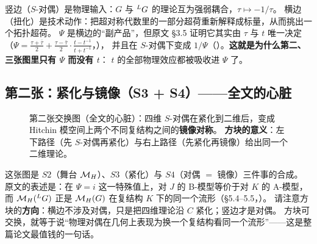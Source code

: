 竖边（$S$-对偶）是物理输入：$G$ 与 ${}^{L}G$ 的理论互为强弱耦合，$\tau\mapsto-1/\tau$。
横边（扭化）是技术动作：把超对称代数里的一部分超荷重新解释成标量，从而挑出一个拓扑超荷。
$\Psi$ 是横边的“副产品”，但原文 \S3.5 证明它其实由 $\tau$ 与 $t$ 唯一决定
（$\Psi=\frac{\tau+\bar\tau}{2}+\frac{\tau-\bar\tau}{2}\cdot\frac{t-t^{-1}}{t+t^{-1}}$，），
并且在 $S$-对偶下变成 $1/\Psi$\pA（）。\textbf{这就是为什么第二、三张图里只有 $\Psi$ 而没有 $t$}：
$t$ 的全部物理效应都被吸收进 $\Psi$ 了。

\subsection{第二张：紧化与镜像（S3 + S4）——全文的心脏}

\begin{figure}[htbp]
\centering
{}
\caption{第二张交换图（全文的心脏）：四维 $S$-对偶在紧化到二维后，变成 Hitchin 模空间上两个不同复结构之间的\textbf{镜像对称}。
\textbf{方块的意义}：左下路径（先 $S$-对偶再紧化）与右上路径（先紧化再镜像）给出同一个二维理论。}
\label{fig:concept-2}
\end{figure}

这张图是 $S2$（舞台 $\mathcal{M}_H$）、$S3$（紧化）与 $S4$（对偶 $=$ 镜像）三件事的合成。
原文的表述是：在 $\Psi=i$ 这一特殊值上，对 $J$ 的 B-模型等价于对 $K$ 的 A-模型，而
$\mathcal{M}_H({}^{L}G)$ 正是 $\mathcal{M}_H(G)$ 在复结构 $K$ 下的同一个流形\pA（\S5.4--5.5，）。
请注意方块的\textbf{方向}：横边不涉及对偶，只是把四维理论沿 $C$ 紧化；竖边才是对偶。
方块可交换，就等于说“物理对偶在几何上表现为换一个复结构看同一个流形”——这是整篇论文最值钱的一句话。

